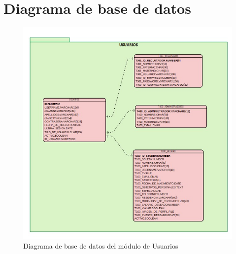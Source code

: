 \clearpage

\section{Diagrama de base de datos}

\begin{figure}[hbtp!]
    \begin{center}
            \includegraphics[width=.6\textwidth]{anexos/imagenes/Usuarios.jpeg}
            
    \end{center}
        \label{fig:MI-Planeacion}
            \caption{Diagrama de base de datos del módulo de Usuarios}
    
    \end{figure}

%
%

